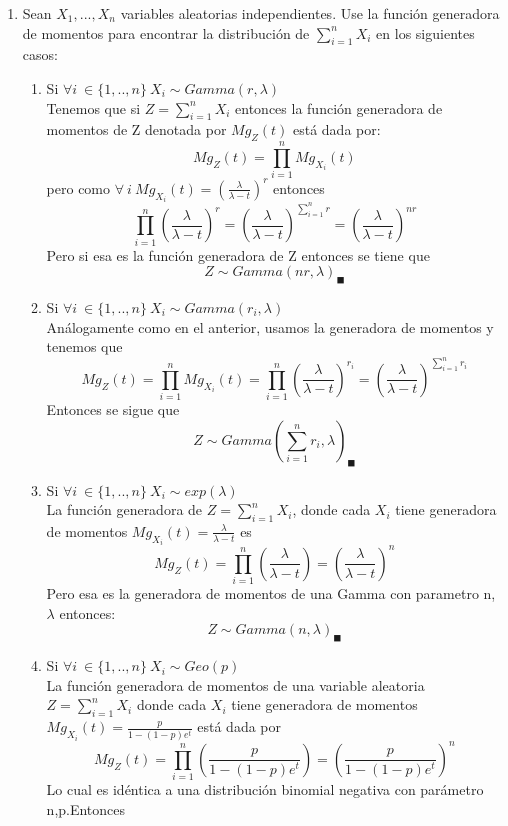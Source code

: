 \documentclass[11pt,a4paper]{report}
\begin{document}
\begin{enumerate}
		\item{
			Sean $X_{1},...,X_{n}$ variables aleatorias independientes. Use la función generadora de momentos para encontrar la distribución de $\sum_{i=1}^{n}X_{i}$ en los siguientes casos:\\
			\begin{enumerate}
			    \item {Si $\forall i \ \in \lbrace 1,..,n \rbrace \ X_{i} \sim Gamma(r,\lambda)$}
			    \\
	        Tenemos que si $Z=\sum_{i=1}^{n}X_{i}$ entonces la función generadora de momentos de Z denotada por $Mg_{Z}(t)$ está dada por:
	        $$Mg_{Z}(t)=\prod_{i=1}^{n} Mg_{X_{i}}(t)$$ pero como $\forall \ i \ Mg_{X_{i}}(t)=(\frac{\lambda}{\lambda-t})^{r}$ entonces
	        $$\prod_{i=1}^{n}(\frac{\lambda}{\lambda-t})^{r}=(\frac{\lambda}{\lambda-t})^{\sum_{i=1}^{n}r}=(\frac{\lambda}{\lambda-t})^{nr}$$
	        Pero si esa es la función generadora de Z entonces se tiene que $$Z \sim Gamma(nr,\lambda)_{\blacksquare}$$
			    \item{Si $\forall i \ \in \lbrace 1,..,n \rbrace \ X_{i} \sim Gamma(r_{i},\lambda)$ } \\
			    Análogamente como en el anterior, usamos la generadora de momentos y tenemos que
			    $$Mg_{Z}(t)=\prod_{i=1}^{n}Mg_{X_{i}}(t)=\prod_{i=1}^{n}(\frac{\lambda}{\lambda-t})^{r_{i}}=(\frac{\lambda}{\lambda-t})^{\sum_{i=1}^{n}r_{i}}$$
			    Entonces se sigue que $$Z\sim Gamma(\sum_{i=1}^{n}r_{i},\lambda)_{\blacksquare}$$
                \item{Si $\forall i \ \in \lbrace 1,..,n \rbrace \ X_{i} \sim exp(\lambda)$ }\\
                La función generadora de $Z=\sum_{i=1}^{n}X_{i}$, donde cada $X_{i}$ tiene generadora de momentos $Mg_{X_{i}}(t)=\frac{\lambda}{\lambda-t}$ es 
                $$Mg_{Z}(t)=\prod_{i=1}^{n}(\frac{\lambda}{\lambda-t})=(\frac{\lambda}{\lambda-t})^{n}$$
                Pero esa es la generadora de momentos de una Gamma con parametro n, $\lambda$ entonces:
                $$Z\sim Gamma(n,\lambda)_{\blacksquare}$$
                \item{Si $\forall i \ \in \lbrace 1,..,n \rbrace \ X_{i} \sim Geo(p)$ }\\
                La función generadora de momentos de una variable aleatoria $Z=\sum_{i=1}^{n}X_{i}$ donde cada $X_{i}$ tiene generadora de momentos $Mg_{X_{i}}(t)=\frac{p}{1-(1-p)e^t}$ está dada por
                $$Mg_{Z}(t)=\prod_{i=1}^{n}(\frac{p}{1-(1-p)e^t})=(\frac{p}{1-(1-p)e^t})^n$$ Lo cual es idéntica a una distribución binomial negativa con parámetro n,p.Entonces 

\end{enumerate}}
\end{enumerate}
\end{document}
